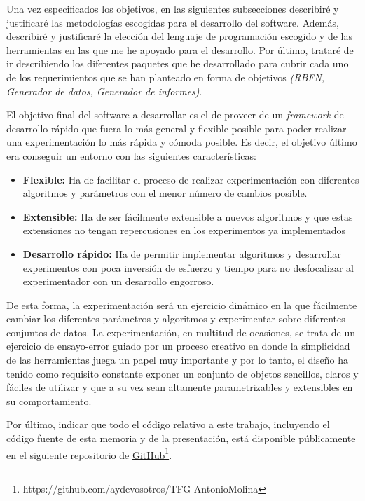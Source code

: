 \documentclass[10pt,a4paper]{report}
\begin{document}
Una vez especificados los objetivos, en las siguientes subsecciones describiré y justificaré las metodologías escogidas para el desarrollo del software. Además, describiré y justificaré la elección del lenguaje de programación escogido y de las herramientas en las que me he apoyado para el desarrollo. Por último, trataré de ir describiendo los diferentes paquetes que he desarrollado para cubrir cada uno de los requerimientos que se han planteado en forma de objetivos \textit{(RBFN, Generador de datos, Generador de informes)}.

El objetivo final del software a desarrollar es el de proveer de un \textit{framework} de desarrollo rápido que fuera lo más general y flexible posible para poder realizar una experimentación lo más rápida y cómoda posible. Es decir, el objetivo último era conseguir un entorno con las siguientes características:
\begin{itemize}
	\item \textbf{Flexible:} Ha de facilitar el proceso de realizar experimentación con diferentes algoritmos y parámetros con el menor número de cambios posible.
	\item \textbf{Extensible:} Ha de ser fácilmente extensible a nuevos algoritmos y que estas extensiones no tengan repercusiones en los experimentos ya implementados
	\item \textbf{Desarrollo rápido:} Ha de permitir implementar algoritmos y desarrollar experimentos con poca inversión de esfuerzo y tiempo para no desfocalizar al experimentador con un desarrollo engorroso.
\end{itemize}

De esta forma, la experimentación será un ejercicio dinámico en la que fácilmente cambiar los diferentes parámetros y algoritmos y experimentar sobre diferentes conjuntos de datos. La experimentación, en multitud de ocasiones, se trata de un ejercicio de ensayo-error guiado por un proceso creativo en donde la simplicidad de las herramientas juega un papel muy importante y por lo tanto, el diseño ha tenido como requisito constante exponer un conjunto de objetos sencillos, claros y fáciles de utilizar y que a su vez sean altamente parametrizables y extensibles en su comportamiento.

Por último, indicar que todo el código relativo a este trabajo, incluyendo el código fuente de esta memoria y de la presentación, está disponible públicamente en el siguiente repositorio de \href{https://github.com/aydevosotros/TFG-AntonioMolina}{GitHub}\footnote{https://github.com/aydevosotros/TFG-AntonioMolina}.
\end{document}

